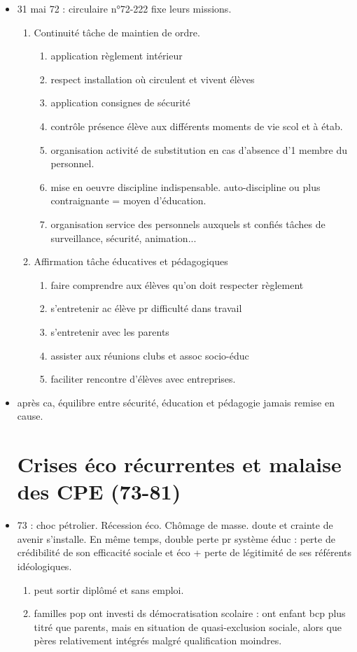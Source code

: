 \documentclass[12pt]{report}
\begin{document}
\begin{itemize}
 \item 31 mai 72 : circulaire n°72-222 fixe leurs missions.
 \begin{enumerate}
 \item Continuité tâche de maintien de ordre.
 \begin{enumerate}
 \item application règlement intérieur
 \item respect installation où circulent et vivent élèves
 \item application consignes de sécurité
 \item contrôle présence élève aux différents moments de vie scol et à étab.
 \item organisation activité de substitution en cas d'absence d'1 membre du personnel. 
 \item mise en oeuvre discipline indispensable. auto-discipline ou plus contraignante = moyen d'éducation.
 \item organisation service des personnels auxquels st confiés tâches de surveillance, sécurité, animation... \\
 \end{enumerate}
 \item Affirmation tâche éducatives et pédagogiques 
 \begin{enumerate}
 \item faire comprendre aux élèves qu'on doit respecter règlement
 \item s'entretenir ac élève pr difficulté dans travail
 \item s'entretenir avec les parents
 \item assister aux réunions clubs et assoc socio-éduc
 \item faciliter rencontre d'élèves avec entreprises.
 \end{enumerate}
 \end{enumerate}

\item après ca, équilibre entre sécurité, éducation et pédagogie jamais remise en cause.

\section{Crises éco récurrentes et malaise des CPE (73-81)}

\item 73 : choc pétrolier. Récession éco. Chômage de masse. doute et crainte de avenir s'installe. En même temps, double perte pr système éduc : perte de crédibilité de son efficacité sociale et éco + perte de légitimité de ses référents idéologiques.\\
\begin{enumerate}
\item peut sortir diplômé et sans emploi. \\
\item familles pop ont investi ds démocratisation scolaire : ont enfant bcp plus titré que parents, mais en situation de quasi-exclusion sociale, alors que pères relativement intégrés malgré qualification moindres.\\
\end{enumerate}


\end{itemize}
\end{document}

